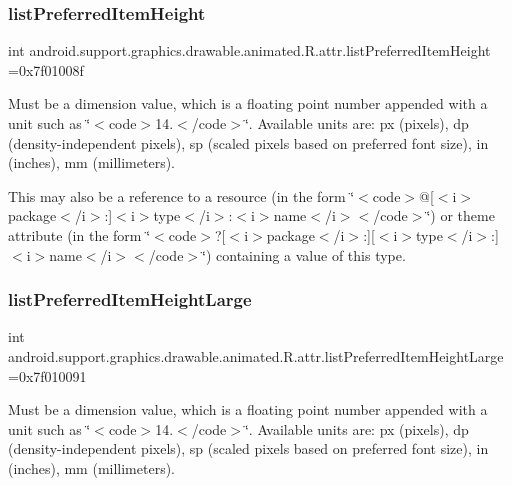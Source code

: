 \subsubsection{\texorpdfstring{list\+Preferred\+Item\+Height}{listPreferredItemHeight}}
{\footnotesize\ttfamily int android.\+support.\+graphics.\+drawable.\+animated.\+R.\+attr.\+list\+Preferred\+Item\+Height =0x7f01008f\hspace{0.3cm}{\ttfamily [static]}}

Must be a dimension value, which is a floating point number appended with a unit such as \char`\"{}$<$code$>$14.\+5sp$<$/code$>$\char`\"{}. Available units are\+: px (pixels), dp (density-\/independent pixels), sp (scaled pixels based on preferred font size), in (inches), mm (millimeters). 

This may also be a reference to a resource (in the form \char`\"{}$<$code$>$@\mbox{[}$<$i$>$package$<$/i$>$\+:\mbox{]}$<$i$>$type$<$/i$>$\+:$<$i$>$name$<$/i$>$$<$/code$>$\char`\"{}) or theme attribute (in the form \char`\"{}$<$code$>$?\mbox{[}$<$i$>$package$<$/i$>$\+:\mbox{]}\mbox{[}$<$i$>$type$<$/i$>$\+:\mbox{]}$<$i$>$name$<$/i$>$$<$/code$>$\char`\"{}) containing a value of this type. \mbox{\label{classandroid_1_1support_1_1graphics_1_1drawable_1_1animated_1_1R_1_1attr_acdb051311879bb9f761285da0df09ec1}} 
\subsubsection{\texorpdfstring{list\+Preferred\+Item\+Height\+Large}{listPreferredItemHeightLarge}}
{\footnotesize\ttfamily int android.\+support.\+graphics.\+drawable.\+animated.\+R.\+attr.\+list\+Preferred\+Item\+Height\+Large =0x7f010091\hspace{0.3cm}{\ttfamily [static]}}

Must be a dimension value, which is a floating point number appended with a unit such as \char`\"{}$<$code$>$14.\+5sp$<$/code$>$\char`\"{}. Available units are\+: px (pixels), dp (density-\/independent pixels), sp (scaled pixels based on preferred font size), in (inches), mm (millimeters). 

